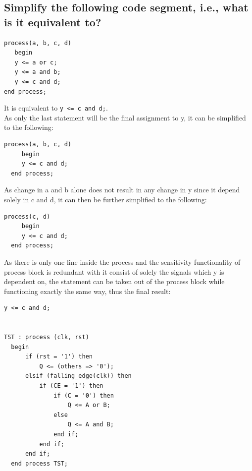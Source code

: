 \documentclass{article}
\renewcommand{\thesubsection}{\thesection.\alph{subsection}}
\begin{document}
\newpage
\subsection{Simplify the following code segment, i.e., what is it equivalent to?}
\begin{lstlisting}[style=VHDL]
process(a, b, c, d)
   begin 
   y <= a or c;
   y <= a and b;
   y <= c and d; 
end process;
\end{lstlisting}

It is equivalent to \lstinline[style=VHDL]{y <= c and d;}.\\

As only the last statement will be the final assignment to y,
it can be simplified to the following:
\begin{lstlisting}[style=VHDL]
  process(a, b, c, d)
     begin 
     y <= c and d; 
  end process;
  \end{lstlisting}

As change in a and b alone does not result in any change in y since it depend solely in c and d,
it can then be further simplified to the following:
\begin{lstlisting}[style=VHDL]
  process(c, d)
     begin 
     y <= c and d; 
  end process;
  \end{lstlisting}

As there is only one line inside the process and the sensitivity functionality of process block
is redundant with it consist of solely the signals which y is dependent on, the statement can be 
taken out of the process block while functioning exactly the same way, thus the final result:
\begin{lstlisting}[style=VHDL]
     y <= c and d; 
\end{lstlisting}

\newpage

\renewcommand\thesubsection{\thesection.\roman{subsection}}

\section{}

\begin{lstlisting}[style=VHDL]
  TST : process (clk, rst)
  begin
      if (rst = '1') then
          Q <= (others => '0');
      elsif (falling_edge(clk)) then
          if (CE = '1') then
              if (C = '0') then
                  Q <= A or B;
              else
                  Q <= A and B;
              end if;
          end if;
      end if;
  end process TST;
\end{lstlisting}
\end{document}
